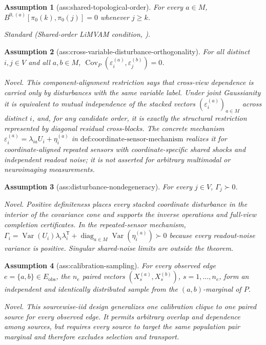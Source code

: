 \documentclass{article}
\newtheorem{assumption}{Assumption}
\begin{document}
\begin{assumption}[ass:shared-topological-order]\label{ass:shared-topological-order}
For every \(a\in M\), \(B^{0,(a)}[\pi_0(k),\pi_0(j)]=0\) whenever \(j\ge k\).
\par\smallskip\noindent\emph{Standard} (Shared-order LiMVAM condition, \cite{HeurtebiseEtAl2026LiMVAM}).
\end{assumption}

\begin{assumption}[ass:cross-variable-disturbance-orthogonality]\label{ass:cross-variable-disturbance-orthogonality}
For all distinct \(i,j\in V\) and all \(a,b\in M\), \(\operatorname{Cov}_P(\varepsilon_i^{(a)},\varepsilon_j^{(b)})=0\).
\par\smallskip\noindent\emph{Novel.} This component-alignment restriction says that cross-view dependence is carried only by disturbances with the same variable label. Under joint Gaussianity it is equivalent to mutual independence of the stacked vectors \((\varepsilon_i^{(a)})_{a\in M}\) across distinct \(i\), and, for any candidate order, it is exactly the structural restriction represented by diagonal residual cross-blocks. The concrete mechanism \(\varepsilon_i^{(a)}=\lambda_{ia}U_i+\eta_i^{(a)}\) in \(\text{def:coordinate-sensor-mechanism}\) realizes it for coordinate-aligned repeated sensors with coordinate-specific shared shocks and independent readout noise; it is not asserted for arbitrary multimodal or neuroimaging measurements.
\end{assumption}

\begin{assumption}[ass:disturbance-nondegeneracy]\label{ass:disturbance-nondegeneracy}
For every \(j\in V\), \(\Gamma_j\succ0\).
\par\smallskip\noindent\emph{Novel.} Positive definiteness places every stacked coordinate disturbance in the interior of the covariance cone and supports the inverse operations and full-view completion certificates. In the repeated-sensor mechanism, \(\Gamma_i=\operatorname{Var}(U_i)\lambda_i\lambda_i^{\mathsf T}+\operatorname{diag}_{a\in M}\operatorname{Var}(\eta_i^{(a)})\succ0\) because every readout-noise variance is positive. Singular shared-noise limits are outside the theorem.
\end{assumption}

\begin{assumption}[ass:calibration-sampling]\label{ass:calibration-sampling}
For every observed edge \(e=\{a,b\}\in E_{\mathrm{obs}}\), the \(n_e\) paired vectors \((X_s^{(a)},X_s^{(b)})\), \(s=1,\ldots,n_e\), form an independent and identically distributed sample from the \((a,b)\)-marginal of \(P\).
\par\smallskip\noindent\emph{Novel.} This sourcewise-iid design generalizes one calibration clique to one paired source for every observed edge. It permits arbitrary overlap and dependence among sources, but requires every source to target the same population pair marginal and therefore excludes selection and transport.
\end{assumption}
\end{document}
